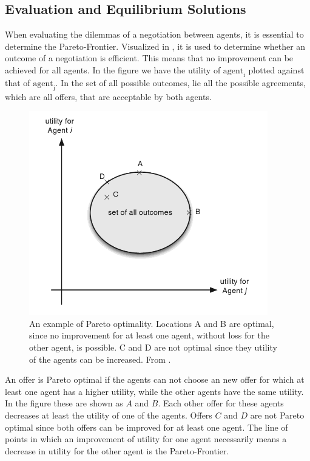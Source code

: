 \subsection{Evaluation and Equilibrium Solutions}
When evaluating the dilemmas of a negotiation between agents, it is essential to determine the Pareto-Frontier. Visualized in , it is used to determine whether an outcome of a negotiation is efficient. This means that no improvement can be achieved for all agents. In the figure we have the utility of $\text{agent}_\text{i}$ plotted against that of  $\text{agent}_\text{j}$. In the set of all possible outcomes, lie all the possible agreements, which are all offers, that are acceptable by both agents.

\begin{figure}[h]
	\centering
	\includegraphics[width=0.7\linewidth]{img/parito_optimal.png}
	\caption{An example of Pareto optimality. Locations A and B are optimal, since no improvement for at least one agent, without loss for the other agent, is possible. C and D are not optimal since they utility of the agents can be increased. From \citet{fatima2014principles}.}
	\label{fig:paritooptimal}
\end{figure}

An offer is Pareto optimal if the agents can not choose an new offer for which at least one agent has a higher utility, while the other agents have the same utility. In the figure these are shown as $A$ and $B$. Each other offer for these agents decreases at least the utility of one of the agents. Offers $C$ and $D$ are not Pareto optimal since both offers can be improved for at least one agent. The line of points in which an improvement of utility for one agent necessarily means a decrease in utility for the other agent is the Pareto-Frontier. 

